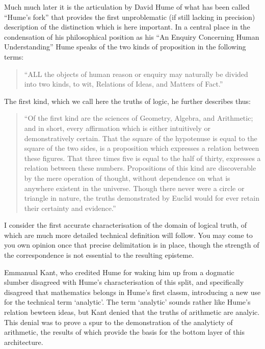 \documentclass[10pt,titlepage]{article}
\begin{document}
Much much later it is the articulation by David Hume of what has been called ``Hume's fork'' that provides the first unproblematic (if still lacking in precision) description of the distinction which is here important.
In a central place in the condensation of his philosophical position as his ``An Enquiry Concerning Human Understanding'' \cite{hume48} Hume speaks of the two kinds of proposition in the following terms:

\begin{quote}
``ALL the objects of human reason or enquiry may naturally be divided
  into two kinds, to wit, Relations of Ideas, and Matters of Fact.'' 
\end{quote}

The first kind, which we call here the truths of logic, he further describes thus:

\begin{quote}
``Of the first kind are the sciences of Geometry, Algebra, and
Arithmetic; and in short, every affirmation which is either
intuitively or demonstratively certain.
That the square of the hypotenuse is equal to the square of the two
sides, is a proposition which expresses a relation between these
figures.
That three times five is equal to the half of thirty, expresses a
relation between these numbers.
Propositions of this kind are discoverable by the mere operation of
thought, without dependence on what is anywhere existent in the
universe.
Though there never were a circle or triangle in nature, the truths
demonstrated by Euclid would for ever retain their certainty and
evidence.''
\end{quote}

I consider the first accurate characterisation of the domain of logical truth, of which are much more detailed technical definition will follow.
You may come to you own opinion once that precise delimitation is in place, though the strength of the correspondence is not essential to the resulting episteme.

Emmanual Kant, who credited Hume for waking him up from a dogmatic slumber disagreed with Hume's characterisation of this split, and specifically disagreed that mathematics belongs in Hume's first classm, introducing a new use for the technical term `analytic'.
The term `analytic' sounds rather like Hume's relation bewteen ideas, but Kant denied that the truths of arithmetic are analyic.
This denial was to prove a spur to the demonstration of the analyticty of arithmetic, the results of which provide the basis for the bottom layer of this architecture.
\end{document}
